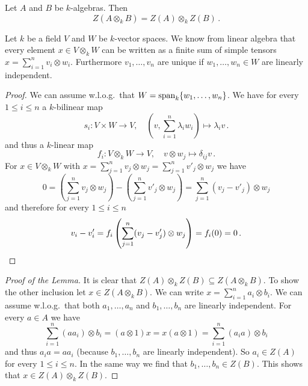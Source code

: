\begin{lemma}\label{lemma: Z(A o B) = Z(A) o Z(B)}
  Let $A$ and $B$ be $k$-algebras.
  Then
  \[
      Z(A \otimes_k B)
    = Z(A) \otimes_k Z(B) \,.
  \]
\end{lemma}


\begin{recall}
  Let $k$ be a field $V$ and $W$ be $k$-vector spaces.
  We know from linear algebra that every element $x \in V \otimes_k W$ can be written as a finite sum of simple tensors $x = \sum_{i=1}^n v_i \otimes w_i$.
  Furthermore $v_1, \dotsc, v_n$ are unique if $w_1, \dotsc, w_n \in W$ are linearly independent.
  \begin{proof}
    We can assume w.l.o.g.\ that $W = \operatorname{span}_k \{w_1, \dotsc, w_n\}$.
    We have for every $1 \leq i \leq n$ a $k$-bilinear map
    \[
              s_i
      \colon  V \times W \to V,
      \quad   \left(v, \sum_{i=1}^n \lambda_i w_i\right)
      \mapsto \lambda_i v \,.
    \]
    and thus a $k$-linear map
    \[
              f_i
      \colon  V \otimes_k W
      \to     V,
      \quad   v \otimes w_j
      \mapsto \delta_{ij} v \,.
    \]
    For $x \in V \otimes_k W$ with $x = \sum_{j=1}^n v_j \otimes w_j = \sum_{j=1}^n v'_j \otimes w_j$ we have
    \[
        0
      =   \left( \sum_{j=1}^n v_j \otimes w_j \right)
        - \left( \sum_{j=1}^n v'_j \otimes w_j \right)
      = \sum_{j=1}^n (v_j - v'_j) \otimes w_j
    \]
    and therefore for every $1 \leq i \leq n$
    \[
        v_i - v'_i
      = f_i\left( \sum_{j=1}^n (v_j - v'_j) \otimes w_j\right)
      = f_i(0)
      = 0 \,.
      \qedhere
    \]
  \end{proof}
\end{recall}


\begin{proof}[Proof of the Lemma]
  It is clear that $Z(A) \otimes_k Z(B) \subseteq Z(A \otimes_k B)$.
  To show the other inclusion let $x \in Z(A \otimes_k B)$.
  We can write $x = \sum_{i=1}^n a_i \otimes b_i$.
  We can assume w.l.o.g.\ that both $a_1, \dotsc, a_n$ and $b_1, \dotsc, b_n$ are linearly independent.
  For every $a \in A$ we have
  \[
      \sum_{i=1}^n (a a_i) \otimes b_i
    = (a \otimes 1) x
    = x (a \otimes 1)
    = \sum_{i=1}^n (a_i a) \otimes b_i
  \]
  and thus $a_i a = a a_i$ (because $b_1, \dotsc, b_n$ are linearly independent).
  So $a_i \in Z(A)$ for every $1 \leq i \leq n$.
  In the same way we find that $b_1, \dotsc, b_n \in Z(B)$.
  This shows that $x \in Z(A) \otimes_k Z(B)$.
\end{proof}


